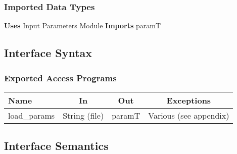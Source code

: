 \documentclass[12pt]{article}
\begin{document}
\subsubsection{Imported Data Types}
\textbf{Uses} Input Parameters Module \textbf{Imports} paramT 


\subsection{Interface Syntax}



\subsubsection{Exported Access Programs}

\begin{center}
\begin{tabular}{l c c c}
\hline
\textbf{Name} & \textbf{In} & \textbf{Out} & \textbf{Exceptions} \\ \hline
load\_{params} & String (file) & paramT & Various (see appendix) \\
\hline
\end{tabular}
\end{center}


\subsection{Interface Semantics}


\end{document}
